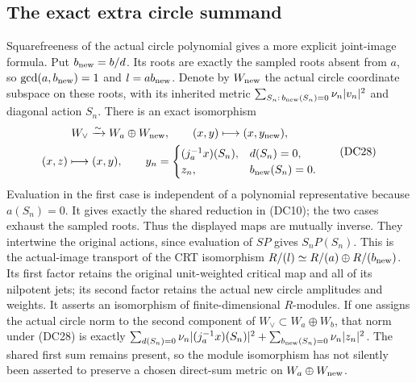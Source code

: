 \documentclass{article}
\begin{document}
\subsection{The exact extra circle summand}

Squarefreeness of the actual circle polynomial gives a more explicit
joint-image formula.  Put $b_{\rm new}=b/d$.  Its roots are exactly
the sampled roots absent from $a$, so
$\gcd(a,b_{\rm new})=1$ and $l=ab_{\rm new}$.  Denote by
$W_{\rm new}$ the actual circle coordinate subspace on these
roots, with its inherited metric
$\sum_{S_n:\,b_{\rm new}(S_n)=0}\nu_n|v_n|^2$ and diagonal
action $S_n$.  There is an exact isomorphism
\[
 \begin{gathered}
 W_\vee\xrightarrow{\sim}W_a\oplus W_{\rm new},\qquad
 (x,y)\longmapsto(x,y_{\rm new}),\\
 (x,z)\longmapsto(x,y),\qquad
 y_n=
 \begin{cases}
       (j_a^{-1}x)(S_n),&d(S_n)=0,\\
       z_n,&b_{\rm new}(S_n)=0 .
 \end{cases}
 \end{gathered}
 \tag{DC28}
\]
Evaluation in the first case is independent of a polynomial
representative because $a(S_n)=0$.  It gives exactly the shared
reduction in (DC10); the two cases exhaust the sampled roots.
Thus the displayed maps are mutually inverse.  They intertwine the
original actions, since evaluation of $SP$ gives $S_nP(S_n)$.
This is the actual-image transport of the CRT isomorphism
$R/(l)\simeq R/(a)\oplus R/(b_{\rm new})$.
Its first factor retains the original unit-weighted critical map
and all of its nilpotent jets; its second factor retains the actual
new circle amplitudes and weights.  It asserts an isomorphism of
finite-dimensional $R$-modules.  If one assigns the actual circle
norm to the second component of $W_\vee\subset W_a\oplus W_b$,
that norm under (DC28) is exactly
$\sum_{d(S_n)=0}\nu_n|(j_a^{-1}x)(S_n)|^2+
\sum_{b_{\rm new}(S_n)=0}\nu_n|z_n|^2$.
The shared first sum remains present, so the module isomorphism
has not silently been asserted to preserve a chosen direct-sum
metric on $W_a\oplus W_{\rm new}$.
\end{document}
